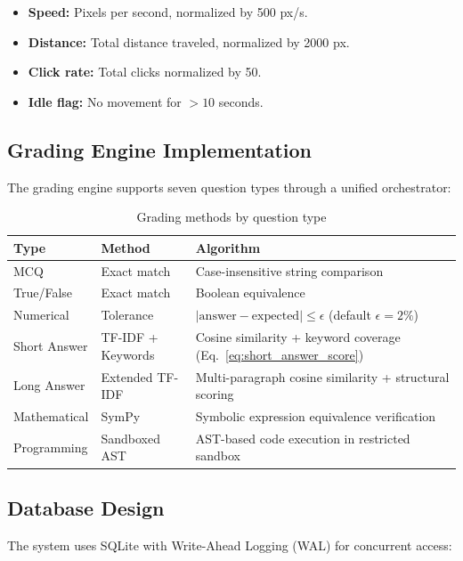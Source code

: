 \documentclass{article}
\begin{document}
\begin{itemize}
    \item \textbf{Speed:} Pixels per second, normalized by 500 px/s.
    \item \textbf{Distance:} Total distance traveled, normalized by 2000 px.
    \item \textbf{Click rate:} Total clicks normalized by 50.
    \item \textbf{Idle flag:} No movement for $>10$ seconds.
\end{itemize}

\subsection{Grading Engine Implementation}

The grading engine supports seven question types through a unified orchestrator:

\begin{table}[H]
\centering
\caption{Grading methods by question type}
\label{tab:grading}
\begin{tabular}{l l p{6cm}}
\toprule
\textbf{Type} & \textbf{Method} & \textbf{Algorithm} \\
\midrule
MCQ & Exact match & Case-insensitive string comparison \\
True/False & Exact match & Boolean equivalence \\
Numerical & Tolerance & $|\text{answer} - \text{expected}| \leq \epsilon$ (default $\epsilon = 2\%$) \\
Short Answer & TF-IDF + Keywords & Cosine similarity + keyword coverage (Eq.~\ref{eq:short_answer_score}) \\
Long Answer & Extended TF-IDF & Multi-paragraph cosine similarity + structural scoring \\
Mathematical & SymPy & Symbolic expression equivalence verification \\
Programming & Sandboxed AST & AST-based code execution in restricted sandbox \\
\bottomrule
\end{tabular}
\end{table}

\subsection{Database Design}

The system uses SQLite with Write-Ahead Logging (WAL) for concurrent access:
\end{document}
